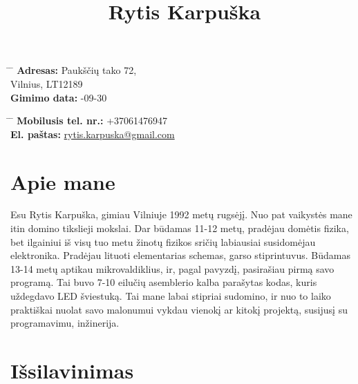 \documentclass[12]{article}
\begin{document}
\title{Rytis Karpuška}


\parbox{0.5\textwidth}{ %
\begin{tabbing} %
\hspace{3cm} \= \hspace{4cm} \= \kill %
{\bf Adresas:} \> Paukščių tako 72,\\ %
\> Vilnius, LT12189\\ %
{\bf Gimimo data:} -09-30\\ %
\end{tabbing}}
\hfill %
\parbox{0.5\textwidth}{ %
\begin{tabbing} %
\hspace{3cm} \= \hspace{4cm} \= \kill %
{\bf Mobilusis tel. nr.:} \> +37061476947 \\ %
{\bf El. paštas:} \> \href{mailto:rytis.karpuska@gmail.com}{rytis.karpuska@gmail.com} \\ %
\end{tabbing}}

\section{Apie mane}

Esu Rytis Karpuška, gimiau Vilniuje 1992 metų rugsėjį. Nuo pat vaikystės mane itin domino tikslieji mokslai.
Dar būdamas 11-12 metų, pradėjau domėtis fizika, bet ilgainiui iš visų tuo metu žinotų fizikos sričių labiausiai susidomėjau elektronika.
Pradėjau lituoti elementarias schemas, garso stiprintuvus.
Būdamas 13-14 metų aptikau mikrovaldiklius, ir, pagal pavyzdį, pasirašiau pirmą savo programą.
Tai buvo 7-10 eilučių asemblerio kalba parašytas kodas, kuris uždegdavo LED šviestuką.
Tai mane labai stipriai sudomino, ir nuo to laiko praktiškai nuolat savo malonumui vykdau vienokį ar kitokį projektą, susijusį su programavimu, inžinerija.


\section{Išsilavinimas}

\end{document}
